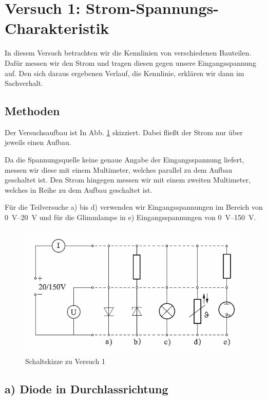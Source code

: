 \documentclass[11pt,a4paper,titlepage, ngerman]{article}
\begin{document}
	\section{Versuch 1: Strom-Spannungs-Charakteristik}
		
		In diesem Versuch betrachten wir die Kennlinien von verschiedenen Bauteilen. Dafür messen wir den Strom und tragen diesen gegen unsere Eingangsspannung auf. Den sich daraus ergebenen Verlauf, die Kennlinie, erklären wir dann im Sachverhalt. 
		
		\subsection{Methoden} 
		
		Der Versuchsaufbau ist In Abb. \ref{Schaltskizze1} skizziert. Dabei fließt der Strom nur über jeweils einen Aufbau. 
		
		Da die Spannungsquelle keine genaue Angabe der Eingangsspannung liefert, messen wir diese mit einem Multimeter, welches parallel zu dem Aufbau geschaltet ist. Den Strom hingegen messen wir mit einem zweiten Multimeter, welches in Reihe zu dem Aufbau geschaltet ist.
		
		Für die Teilversuche a) bis d) verwenden wir Eingangsspannungen im Bereich von \SIrange{0}{20}{\V} und für die Glimmlampe in e) Eingangsspannungen von \SIrange{0}{150}{\V}.
		
		\begin{figure}
			\includegraphics[width=\textwidth]{Versuch1.png}
			\caption{Schaltskizze zu Versuch 1}
			\label{Schaltskizze1}
		\end{figure}

		\subsection{a) Diode in Durchlassrichtung} 
			\label{a)}
			
\end{document}
